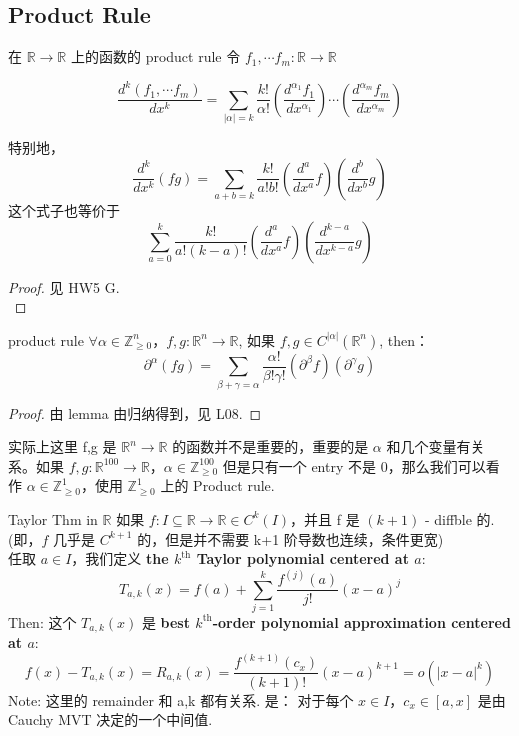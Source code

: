 \subsection{Product Rule}

\begin{lemma}{在 $\mathbb{R} \rightarrow \mathbb{R}$ 上的函数的 product rule}
令 $f_1, \cdots f_m: \mathbb{R} \rightarrow \mathbb{R}$

$$
\frac{d^k {(f_1,\cdots f_m)}}{dx^k} = \sum_{|\alpha| = k} \frac{k!}{\alpha !} (\frac{d^{\alpha_1} f_1}{dx^{\alpha_1}}) \cdots (\frac{d^{\alpha_m} f_m}{dx^{\alpha_m}})
$$

\end{lemma}

\begin{note}
    特别地，$$
    \frac{d^k}{dx^k} (fg) = \sum_{a+b = k} \frac{k!}{a!b!} (\frac{d^a}{dx^a}f) (\frac{d^b}{dx^b} g)
    $$
    这个式子也等价于 $$
    \sum_{a = 0}^k \frac{k!}{a!(k-a)!} (\frac{d^a}{dx^a}f) (\frac{d^{k-a}}{dx^{k-a}} g)
    $$
\end{note}

\begin{proof}
    见 HW5 G. \\
\end{proof}

\begin{theorem}{product rule} \label{product rule}
$\forall \alpha \in \mathbb{Z}_{\geq 0}^n$，$f,g: \mathbb{R}^n \rightarrow \mathbb{R}$, 如果 $f,g \in C^{|\alpha|} (\mathbb{R}^n)$, then：
$$
\partial^{\alpha} (fg) = \sum_{\beta + \gamma = \alpha} \frac{\alpha !}{\beta ! \gamma !} (\partial ^ \beta f) (\partial ^ \gamma g)
$$
\end{theorem}
\begin{proof}
    由 lemma 由归纳得到，见 L08.
\end{proof}
\begin{note}
    实际上这里 f,g 是 $\mathbb{R}^n \rightarrow \mathbb{R}$ 的函数并不是重要的，重要的是 $\alpha$ 和几个变量有关系。如果 $f,g:\mathbb{R}^{100} \rightarrow \mathbb{R} $，$\alpha \in \mathbb{Z}_{\geq 0} ^{100}$ 但是只有一个 entry 不是 0，那么我们可以看作 $\alpha \in \mathbb{Z}_{\geq 0}^1$，使用 $\mathbb{Z}_{\geq 0}^1$ 上的 Product rule.
\end{note}


\begin{lemma}{Taylor Thm in $\mathbb{R}$}
如果 $f: I \subseteq \mathbb{R} \rightarrow \mathbb{R} \in C^k(I)$，并且 f 是 $(k+1)$ - diffble 的.\\
(即，$f$ 几乎是 $C^{k+1}$ 的，但是并不需要 k+1 阶导数也连续，条件更宽)\\
任取 $a \in I$，我们定义 \textbf{the $k^\text{th}$ Taylor polynomial centered at $a$}:
$$
T_{a,k}(x) = f(a) + \sum_{j=1}^k \frac{f^{(j)}(a)}{j!} (x-a)^j
$$
Then: 这个 $T_{a,k}(x)$ 是 \textbf{best $k^\text{th}$-order polynomial approximation centered at $a$}: $$
f(x) - T_{a,k}(x) =  R_{a,k} (x) = \frac{f^{(k+1)}(c_x)}{(k+1)!} (x-a)^{k+1} = o(|x-a|^k)
$$
Note: 这里的 remainder 和 a,k 都有关系. 是：
对于每个 $x \in I$，$c_x \in [a,x]$ 是由 Cauchy MVT 决定的一个中间值.
\end{lemma}

